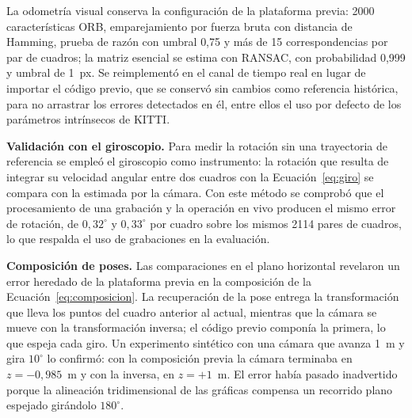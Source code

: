 La odometría visual conserva la configuración de la plataforma previa: 2000 características ORB, emparejamiento por fuerza bruta con distancia de Hamming, prueba de razón con umbral 0,75 y más de 15 correspondencias por par de cuadros; la matriz esencial se estima con RANSAC, con probabilidad 0,999 y umbral de 1~px.
Se reimplementó en el canal de tiempo real en lugar de importar el código previo, que se conservó sin cambios como referencia histórica, para no arrastrar los errores detectados en él, entre ellos el uso por defecto de los parámetros intrínsecos de KITTI.

\textbf{Validación con el giroscopio.}
Para medir la rotación sin una trayectoria de referencia se empleó el giroscopio como instrumento: la rotación que resulta de integrar su velocidad angular entre dos cuadros con la Ecuación~\eqref{eq:giro} se compara con la estimada por la cámara.
Con este método se comprobó que el procesamiento de una grabación y la operación en vivo producen el mismo error de rotación, de $0{,}32^{\circ}$ y $0{,}33^{\circ}$ por cuadro sobre los mismos 2114 pares de cuadros, lo que respalda el uso de grabaciones en la evaluación.

\textbf{Composición de poses.}
Las comparaciones en el plano horizontal revelaron un error heredado de la plataforma previa en la composición de la Ecuación~\eqref{eq:composicion}.
La recuperación de la pose entrega la transformación que lleva los puntos del cuadro anterior al actual, mientras que la cámara se mueve con la transformación inversa; el código previo componía la primera, lo que espeja cada giro.
Un experimento sintético con una cámara que avanza 1~m y gira $10^{\circ}$ lo confirmó: con la composición previa la cámara terminaba en $z = -0{,}985$~m y con la inversa, en $z = +1$~m.
El error había pasado inadvertido porque la alineación tridimensional de las gráficas compensa un recorrido plano espejado girándolo $180^{\circ}$.

